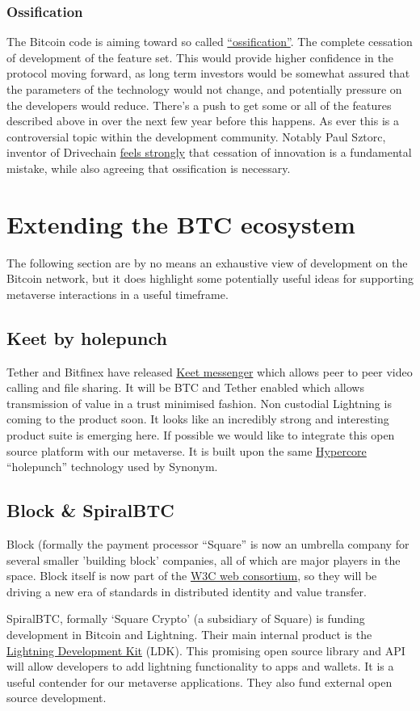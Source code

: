 \subsubsection{Ossification}
The Bitcoin code is aiming toward so called \href{https://en.wikipedia.org/wiki/Protocol_ossification}{``ossification''}. The complete cessation of development of the feature set. This would provide higher confidence in the protocol moving forward, as long term investors would be somewhat assured that the parameters of the technology would not change, and potentially pressure on the developers would reduce. There's a push to get some or all of the features described above in over the next few year before this happens. As ever this is a controversial topic within the development community. Notably Paul Sztorc, inventor of Drivechain \href{https://www.truthcoin.info/blog/sc-vision/}{feels strongly} that cessation of innovation is a fundamental mistake, while also agreeing that ossification is necessary.
\section{Extending the BTC ecosystem }
The following section are by no means an exhaustive view of development on the Bitcoin network, but it does highlight some potentially useful ideas for supporting metaverse interactions in a useful timeframe.
\subsection{Keet by holepunch}
Tether and Bitfinex have released \href{https://keet.io/}{Keet messenger} which allows peer to peer video calling and file sharing. It will be BTC and Tether enabled which allows transmission of value in a trust minimised fashion. Non custodial Lightning is coming to the product soon. It looks like an incredibly strong and interesting product suite is emerging here. If possible we would like to integrate this open source platform with our metaverse. It is built upon the same \href{https://tether.to/en/tether-bitfinex-and-hypercore-launch-holepunch-a-platform-for-building-fully-encrypted-peer-to-peer-applications/}{Hypercore} ``holepunch'' technology used by Synonym.
\subsection{Block \& SpiralBTC}
Block (formally the payment processor ``Square'' is now an umbrella company for several smaller 'building block' companies, all of which are major players in the space. Block itself is now part of the \href{https://www.w3.org/Consortium/Member/List}{W3C web consortium}, so they will be driving a new era of standards in distributed identity and value transfer.\par
SpiralBTC, formally `Square Crypto' (a subsidiary of Square) is funding development in Bitcoin and Lightning. Their main internal product is the \href{https://spiral.xyz/blog/what-were-building-lightning-development-kit/}{Lightning Development Kit} (LDK). This promising open source library and API will allow developers to add lightning functionality to apps and wallets. It is a useful contender for our metaverse applications. They also fund external open source development.\par

